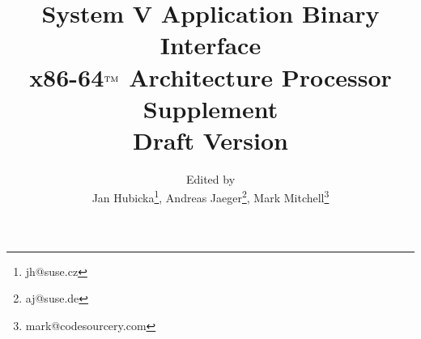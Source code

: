 \documentclass[12pt]{report}
\begin{document}
\author{Edited by\\
  Jan Hubicka\thanks{jh@suse.cz}, Andreas Jaeger\thanks{aj@suse.de},
  Mark Mitchell\thanks{mark@codesourcery.com}}

\title{System V Application Binary Interface\\
{\Large x86-64$^{\rm TM}$ Architecture Processor Supplement\\
Draft Version \version}}
\maketitle
\tableofcontents
\listoftables
\listoffigures











\appendix

\end{document}
